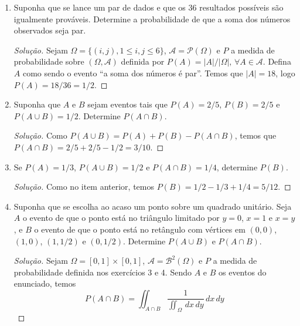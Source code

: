 \documentclass[../Notas.tex]{subfiles}
\begin{document}
\begin{enumerate}
\begin{proof}[Solução]
        Sejam $\Omega = \{1, 2, \dots, 10\}$, $\mathcal{P}(\Omega) = \mathcal{A}$ e $P$ a medida de 
        probabilidade sobre $(\Omega, \mathcal{A})$ definida por $P(A) = |A|/|\Omega|, 
        \, \forall A\in\mathcal{A}$. Defina $A$ como o evento ``o número da bola é 3, 4 ou 5''. Temos
        \[
        P(A) = |A|/|\Omega| = 3/10.
        \]
    \end{proof}
    \item Suponha que se lance um par de dados e que os 36 resultados possíveis são igualmente prováveis. Determine a probabilidade de que a soma dos números observados seja par.
    \begin{proof}[Solução]
        Sejam $\Omega = \{ (i,j), 1\leq i,j\leq 6 \}$, $\mathcal{A} = \mathcal{P}(\Omega)$ e $P$ a medida
        de probabilidade sobre $(\Omega, \mathcal{A})$ definida por $P(A) = |A|/|\Omega|, \, \forall 
        A\in\mathcal{A}$. Defina $A$ como sendo o evento ``a soma dos números é par''. Temos que
        $|A| = 18$, logo $P(A) = 18/36 = 1/2$.
    \end{proof}
    \item Suponha que $A$ e $B$ sejam eventos tais que $P(A) = 2/5$, $P(B) = 2/5$ e $P(A \cup B) = 1/2$. Determine $P(A \cap B)$.
    \begin{proof}[Solução]
        Como $P(A\cup B) = P(A) + P(B) - P(A\cap B)$, temos que $P(A\cap B) = 2/5 + 2/5 - 1/2 = 3/10$.
    \end{proof}
    \item Se $P(A) = 1/3$, $P(A \cup B) = 1/2$ e $P(A \cap B) = 1/4$, determine $P(B)$.
    \begin{proof}[Solução]
        Como no item anterior, temos $P(B) = 1/2 - 1/3 + 1/4 = 5/12$.
    \end{proof}
    \item Suponha que se escolha ao acaso um ponto sobre um quadrado unitário. Seja $A$ o evento de que o ponto está no triângulo limitado por $y = 0$, $x = 1$ e $x = y$, e $B$ o evento de que o ponto está no retângulo com vértices em $(0,0)$, $(1,0)$, $(1, 1/2)$ e $(0,1/2)$. Determine $P(A \cup B)$ e $P(A \cap B)$.
    \begin{proof}[Solução]
        Sejam $\Omega = [0,1]\times[0,1]$, $\mathcal{A} = \mathcal{B}^2(\Omega)$ e $P$ a medida de probabilidade
        definida nos exercícios 3 e 4. Sendo $A$ e $B$ os eventos do enunciado, temos
        \[
        P(A\cap B) = \iint_{A\cap B} \frac{1}{\iint_{\Omega} \, dx \, dy} \, dx \, dy
\]
\end{proof}
\end{enumerate}
\end{document}
